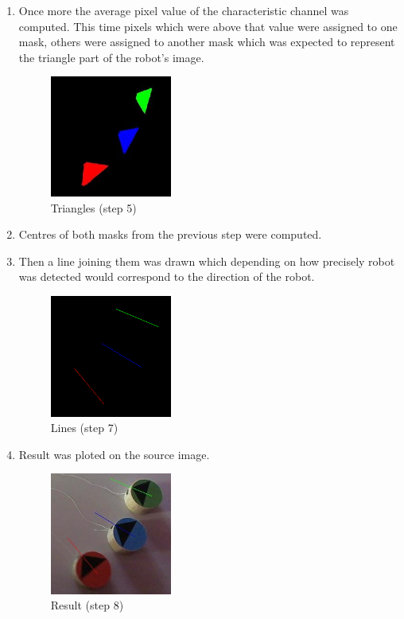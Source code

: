 \documentclass[10pt,a4paper]{article}
\begin{document}
\begin{enumerate}
    \item
    Once more the average pixel value of the characteristic channel was 
    computed. This time pixels which were above that value were assigned to 
    one mask, others were assigned to another mask which was expected to 
    represent the triangle part of the robot's image.
    \begin{figure}[h]
        \centering
        \includegraphics[width=40mm]{d1_i5_triangles.jpg}
        \caption{Triangles (step 5)}
    \end{figure} 

    \item
    Centres of both masks from the previous step were computed. 

    \item
    Then a line joining them was drawn which depending on how precisely robot
    was detected would correspond to the direction of the robot.
    \begin{figure}[h]
        \centering
        \includegraphics[width=40mm]{d1_i5_lines.png}
        \caption{Lines (step 7)}
    \end{figure} 

    \item
    Result was ploted on the source image.
    \begin{figure}[h]
        \centering
        \includegraphics[width=40mm]{d1_i5_result.jpg}
        \caption{Result (step 8)}
    \end{figure} 
\end{enumerate} 
\end{document}
